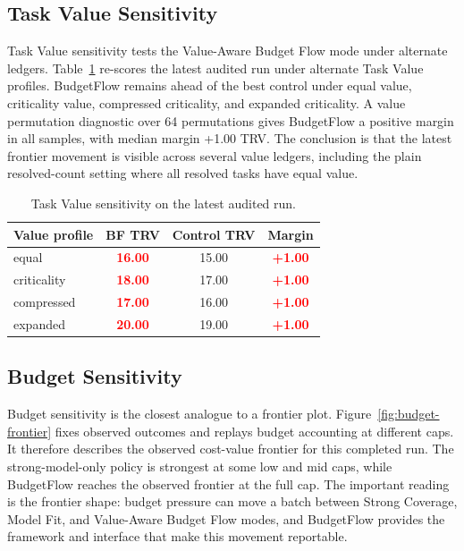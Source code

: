 \documentclass[sigconf,review,anonymous]{acmart}
\newcommand{\method}{BudgetFlow\xspace}
\newcommand{\trv}{TRV\xspace}
\newcommand{\pos}[1]{\textcolor{red}{\textbf{#1}}}
\begin{document}
\subsection{Task Value Sensitivity}
Task Value sensitivity tests the Value-Aware Budget Flow mode under alternate ledgers. Table~\ref{tab:value-sensitivity} re-scores the latest audited run under alternate Task Value profiles. \method remains ahead of the best control under equal value, criticality value, compressed criticality, and expanded criticality. A value permutation diagnostic over 64 permutations gives \method a positive margin in all samples, with median margin +1.00 \trv. The conclusion is that the latest frontier movement is visible across several value ledgers, including the plain resolved-count setting where all resolved tasks have equal value.

\begin{table}[t]
\centering
\small
\begin{tabular}{lccc}
\toprule
Value profile & BF TRV & Control TRV & Margin \\
\midrule
equal & \pos{16.00} & 15.00 & \pos{+1.00} \\
criticality & \pos{18.00} & 17.00 & \pos{+1.00} \\
compressed & \pos{17.00} & 16.00 & \pos{+1.00} \\
expanded & \pos{20.00} & 19.00 & \pos{+1.00} \\
\bottomrule
\end{tabular}
\caption{Task Value sensitivity on the latest audited run.}
\label{tab:value-sensitivity}
\end{table}

\subsection{Budget Sensitivity}
Budget sensitivity is the closest analogue to a frontier plot. Figure~\ref{fig:budget-frontier} fixes observed outcomes and replays budget accounting at different caps. It therefore describes the observed cost-value frontier for this completed run. The strong-model-only policy is strongest at some low and mid caps, while \method reaches the observed frontier at the full cap. The important reading is the frontier shape: budget pressure can move a batch between Strong Coverage, Model Fit, and Value-Aware Budget Flow modes, and \method provides the framework and interface that make this movement reportable.
\end{document}
